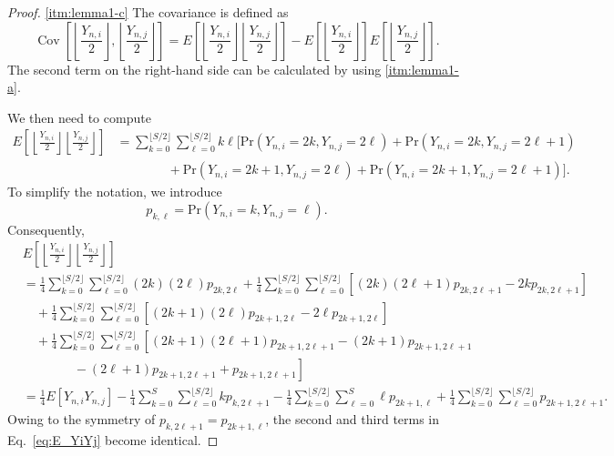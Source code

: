 \documentclass[pre, amsmath, floatfix]{revtex4-2}
\theoremstyle{plain}
\theoremstyle{definition}
\theoremstyle{remark}
\newcommand{\Prob}[1]{\mathrm{Pr}\left(#1\right)} %
\newcommand{\E}[1]{E\left[#1\right]} %
\DeclareMathOperator{\cov}{Cov} %
\newcommand{\Cov}[2]{\cov\left[#1, #2\right]}
\begin{document}
\begin{proof}
\ref{itm:lemma1-c}
The covariance is defined as
\begin{equation}
\Cov{\left\lfloor\frac{Y_{n,i}}{2}\right\rfloor}{\left\lfloor\frac{Y_{n,j}}{2}\right\rfloor}=\E{\left\lfloor\frac{Y_{n,i}}{2}\right\rfloor\left\lfloor\frac{Y_{n,j}}{2}\right\rfloor}-\E{\left\lfloor\frac{Y_{n,i}}{2}\right\rfloor}\E{\left\lfloor\frac{Y_{n,j}}{2}\right\rfloor}.
\label{eq:cov_def}
\end{equation}
The second term on the right-hand side can be calculated by using \ref{itm:lemma1-a}.

We then need to compute
\begin{align*}
\E{\left\lfloor\frac{Y_{n,i}}{2}\right\rfloor \left\lfloor\frac{Y_{n,j}}{2}\right\rfloor}
&=\sum_{k=0}^{\lfloor S/2\rfloor}\sum_{\ell=0}^{\lfloor S/2\rfloor}k\ell[\Prob{Y_{n,i}=2k, Y_{n,j}=2\ell}+\Prob{Y_{n,i}=2k, Y_{n,j}=2\ell+1}\\
&\qquad\qquad+\Prob{Y_{n,i}=2k+1, Y_{n,j}=2\ell}+\Prob{Y_{n,i}=2k+1, Y_{n,j}=2\ell+1}].
\end{align*}
To simplify the notation, we introduce
\[
p_{k, \ell}=\Prob{Y_{n,i}=k, Y_{n,j}=\ell}.
\]
Consequently,
\begin{align}
&\E{\left\lfloor\frac{Y_{n,i}}{2}\right\rfloor \left\lfloor\frac{Y_{n,j}}{2}\right\rfloor}\nonumber\\
&=\frac{1}{4}\sum_{k=0}^{\lfloor S/2\rfloor}\sum_{\ell=0}^{\lfloor S/2\rfloor}(2k)(2\ell)p_{2k, 2\ell}
+\frac{1}{4}\sum_{k=0}^{\lfloor S/2\rfloor}\sum_{\ell=0}^{\lfloor S/2\rfloor}\left[(2k)(2\ell+1)p_{2k, 2\ell+1}-2kp_{2k, 2\ell+1}\right]\nonumber\\
&\quad+\frac{1}{4}\sum_{k=0}^{\lfloor S/2\rfloor}\sum_{\ell=0}^{\lfloor S/2\rfloor}\left[(2k+1)(2\ell)p_{2k+1, 2\ell}-2\ell p_{2k+1, 2\ell}\right]\nonumber\\
&\quad+\frac{1}{4}\sum_{k=0}^{\lfloor S/2\rfloor}\sum_{\ell=0}^{\lfloor S/2\rfloor}\left[(2k+1)(2\ell+1)p_{2k+1, 2\ell+1}-(2k+1)p_{2k+1, 2\ell+1}\right.\nonumber\\
&\qquad\left.\qquad -(2\ell+1)p_{2k+1, 2\ell+1}+p_{2k+1, 2\ell+1}\right]\nonumber\\
&=\frac{1}{4}\E{Y_{n,i}Y_{n,j}}-\frac{1}{4}\sum_{k=0}^S\sum_{\ell=0}^{\lfloor S/2\rfloor}kp_{k, 2\ell+1}-\frac{1}{4}\sum_{k=0}^{\lfloor S/2\rfloor}\sum_{\ell=0}^{S}\ell p_{2k+1, \ell}+\frac{1}{4}\sum_{k=0}^{\lfloor S/2\rfloor}\sum_{\ell=0}^{\lfloor S/2\rfloor}p_{2k+1, 2\ell+1}.
\label{eq:E_YiYj}
\end{align}
Owing to the symmetry of $p_{k, 2\ell+1}=p_{2k+1, \ell}$, the second and third terms in Eq.~\eqref{eq:E_YiYj} become identical.

\end{proof}
\end{document}
